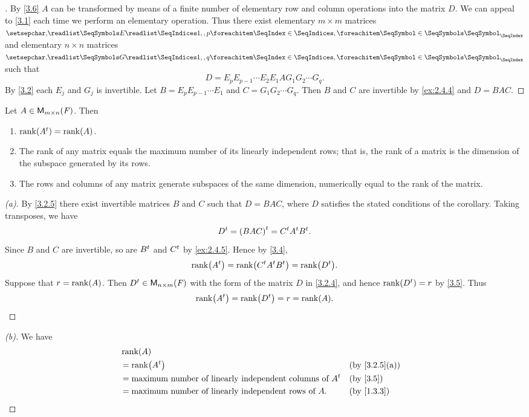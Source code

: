 \begin{proof}[]
	By \cref{3.6} \(A\) can be transformed by means of a finite number of elementary row and column operations into the matrix \(D\).
	We can appeal to \cref{3.1} each time we perform an elementary operation.
	Thus there exist elementary \(m \times m\) matrices \(\seq{E}{1,,p}\) and elementary \(n \times n\) matrices \(\seq{G}{1,,q}\) such that
	\[
		D = E_p E_{p - 1} \cdots E_2 E_1 A G_1 G_2 \cdots G_q.
	\]
	By \cref{3.2} each \(E_j\) and \(G_j\) is invertible.
	Let \(B = E_p E_{p - 1} \cdots E_1\) and \(C = G_1 G_2 \cdots G_q\).
	Then \(B\) and \(C\) are invertible by \cref{ex:2.4.4} and \(D = BAC\).
\end{proof}

\begin{cor}\label{3.2.5}
	Let \(A \in \MS\).
	Then
	\begin{enumerate}
		\item \(\rk{\tp{A}} = \rk{A}\).
		\item The rank of any matrix equals the maximum number of its linearly independent rows;
		      that is, the rank of a matrix is the dimension of the subspace generated by its rows.
		\item The rows and columns of any matrix generate subspaces of the same dimension, numerically equal to the rank of the matrix.
	\end{enumerate}
\end{cor}

\begin{proof}[(a)]
	By \cref{3.2.5} there exist invertible matrices \(B\) and \(C\) such that \(D = BAC\), where \(D\) satisfies the stated conditions of the corollary.
	Taking transposes, we have
	\[
		{D}^{t} = {\left\lparen BAC\right\rparen}^{t} = {C}^{t} {A}^{t} {B}^{t}.
	\]
	Since \(B\) and \(C\) are invertible, so are \({B}^{t}\) and \({C}^{t}\) by \cref{ex:2.4.5}.
	Hence by \cref{3.4},
	\[
		\rk{\tp{A}} = \rk{\tp{C} \tp{A} \tp{B}} = \rk{\tp{D}}.
	\]
	Suppose that \(r = \rk{A}\).
	Then \(\tp{D} \in \ms[n][m][\F]\) with the form of the matrix \(D\) in \cref{3.2.4}, and hence \(\rk{\tp{D}} = r\) by \cref{3.5}.
	Thus
	\[
		\rk{\tp{A}} = \rk{\tp{D}} = r = \rk{A}.
	\]
\end{proof}

\begin{proof}[(b)]
	We have
	\begin{align*}
		 & \rk{A}                                                                                \\
		 & = \rk{\tp{A}}                                                      &  & \by{3.2.5}[a] \\
		 & = \text{maximum number of linearly independent columns of } \tp{A} &  & \by{3.5}      \\
		 & = \text{maximum number of linearly independent rows of } A.        &  & \by{1.3.3}
	\end{align*}
\end{proof}

